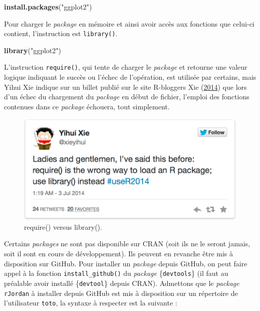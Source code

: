 \documentclass[
  11pt,
]{book}
\newenvironment{Shaded}{\begin{snugshade}}{\end{snugshade}}
\newcommand{\KeywordTok}[1]{\textcolor[rgb]{0.13,0.29,0.53}{\textbf{#1}}}
\newcommand{\NormalTok}[1]{#1}
\newcommand{\StringTok}[1]{\textcolor[rgb]{0.31,0.60,0.02}{#1}}
\numberwithin{equation}{section}
\numberwithin{countremarque}{section}
\begin{document}
\begin{Shaded}
\begin{Highlighting}[]
\KeywordTok{install.packages}\NormalTok{(}\StringTok{"ggplot2"}\NormalTok{)}
\end{Highlighting}
\end{Shaded}

Pour charger le \emph{package} en mémoire et ainsi avoir accès aux fonctions que celui-ci contient, l'instruction est \texttt{library()}.

\begin{Shaded}
\begin{Highlighting}[]
\KeywordTok{library}\NormalTok{(}\StringTok{"ggplot2"}\NormalTok{)}
\end{Highlighting}
\end{Shaded}

L'instruction \texttt{require()}, qui tente de charger le \emph{package} et retourne une valeur logique indiquant le succès ou l'échec de l'opération, est utilisée par certains, mais Yihui Xie indique sur un billet publié sur le site R-bloggers Xie (\protect\hyperlink{ref-Xie_r2014_require}{2014}) que lors d'un échec du chargement du \emph{package} en début de fichier, l'emploi des fonctions contenues dans ce \emph{package} échouera, tout simplement.

\begin{figure}[H]

{\centering \includegraphics[width=0.4\linewidth]{figs/require_vs_library} 

}

\caption{require() versus library().}\label{fig:intro-require}
\end{figure}

Certains \emph{packages} ne sont pas disponible sur CRAN (soit ils ne le seront jamais, soit il sont en cours de développement). Ils peuvent en revanche être mis à disposition sur GitHub. Pour installer un \emph{package} depuis GitHub, on peut faire appel à la fonction \texttt{install\_github()} du \emph{package} \{\texttt{devtools}\} (il faut au préalable avoir installé \{\texttt{devtool}\} depuis CRAN). Admettons que le \emph{package} \texttt{rJordan} à installer depuis GitHub est mis à disposition sur un répertoire de l'utilisateur \texttt{toto}, la syntaxe à respecter est la suivante :
\end{document}
